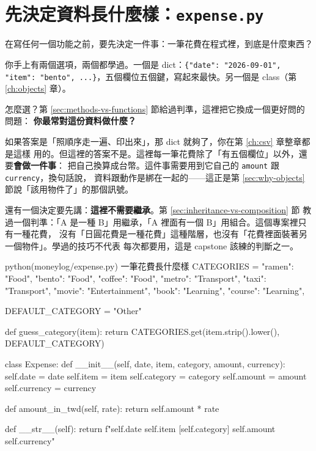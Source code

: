 \section{先決定資料長什麼樣：\texttt{expense.py}}
\label{sec:capstone-model}

在寫任何一個功能之前，要先決定一件事：一筆花費在程式裡，到底是什麼東西？

你手上有兩個選項，兩個都學過。一個是 dict：\texttt{\{"date": "2026-09-01", "item":
"bento", ...\}}，五個欄位五個鍵，寫起來最快。另一個是 class（第 \ref{ch:objects} 章）。

怎麼選？第 \ref{sec:methods-vs-functions} 節給過判準，這裡把它換成一個更好問的問題：
\textbf{你最常對這份資料做什麼？}

如果答案是「照順序走一遍、印出來」，那 dict 就夠了，你在第 \ref{ch:csv} 章整章都是這樣
用的。但這裡的答案不是。這裡每一筆花費除了「有五個欄位」以外，還要\textbf{會做一件事}：
把自己換算成台幣。這件事需要用到它自己的 \texttt{amount} 跟 \texttt{currency}，換句話說，
資料跟動作是綁在一起的——這正是第 \ref{sec:why-objects} 節說「該用物件了」的那個訊號。

還有一個決定要先講：\textbf{這裡不需要繼承}。第 \ref{sec:inheritance-vs-composition} 節
教過一個判準：「A 是一種 B」用繼承，「A 裡面有一個 B」用組合。這個專案裡只有一種花費，
沒有「日圓花費是一種花費」這種階層，也沒有「花費裡面裝著另一個物件」。學過的技巧不代表
每次都要用，這是 capstone 該練的判斷之一。

\begin{example}{python}{(moneylog/expense.py) 一筆花費長什麼樣}
CATEGORIES = {
    "ramen": "Food",
    "bento": "Food",
    "coffee": "Food",
    "metro": "Transport",
    "taxi": "Transport",
    "movie": "Entertainment",
    "book": "Learning",
    "course": "Learning",
}

DEFAULT_CATEGORY = "Other"


def guess_category(item):
    return CATEGORIES.get(item.strip().lower(), DEFAULT_CATEGORY)


class Expense:
    def __init__(self, date, item, category, amount, currency):
        self.date = date
        self.item = item
        self.category = category
        self.amount = amount
        self.currency = currency

    def amount_in_twd(self, rate):
        return self.amount * rate

    def __str__(self):
        return f"{self.date} {self.item} [{self.category}] {self.amount} {self.currency}"
\end{example}

